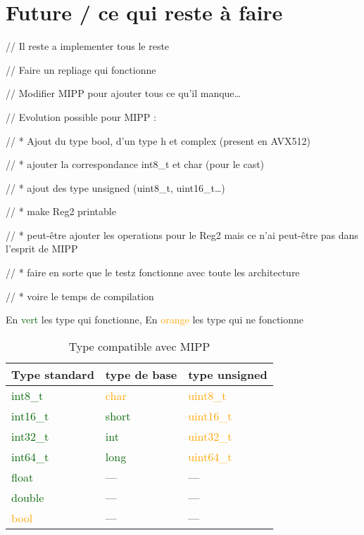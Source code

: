 \section{Future / ce qui reste à faire}

//  Il reste a implementer tous le reste

//  Faire un repliage qui fonctionne

//  Modifier MIPP pour ajouter tous ce qu'il manque\dots

// Evolution possible pour MIPP :

// * Ajout du type bool, d'un type h  et complex (present en AVX512)

// * ajouter la correspondance int8_t et char (pour le cast)

// * ajout des type unsigned (uint8_t, uint16_t\dots)

// * make Reg2 printable

// * peut-être ajouter les operations pour le Reg2 mais ce n'ai peut-être pas dans
l'esprit de MIPP

// * faire en sorte que le testz fonctionne avec toute les architecture

// * voire le temps de compilation

\begin{table}[H]
  \centering
  \caption*{En \textcolor{darkGreen}{vert} les type qui fonctionne, En \textcolor{orange}{orange}
    les type qui ne fonctionne}
  \begin{tabular}[H]{|m{.21\linewidth}|m{.18\linewidth}|m{.21\linewidth}|}
    \hline
    \textbf{Type standard}          & \textbf{type de base}        & \textbf{type unsigned}        \\
    \hline
    \textcolor{darkGreen}{int8_t}  & \textcolor{orange}{char}     & \textcolor{orange}{uint8_t}  \\
    \hline
    \textcolor{darkGreen}{int16_t} & \textcolor{darkGreen}{short} & \textcolor{orange}{uint16_t} \\
    \hline
    \textcolor{darkGreen}{int32_t} & \textcolor{darkGreen}{int}   & \textcolor{orange}{uint32_t} \\
    \hline
    \textcolor{darkGreen}{int64_t} & \textcolor{darkGreen}{long}  & \textcolor{orange}{uint64_t} \\
    \hline
    \textcolor{darkGreen}{float}    & \----                        & \----                         \\
    \hline
    \textcolor{darkGreen}{double}   & \----                        & \----                         \\
    \hline
    \textcolor{orange}{bool}        & \----                        & \----                         \\
    \hline
  \end{tabular}
  \caption{Type compatible avec MIPP}
\end{table}

